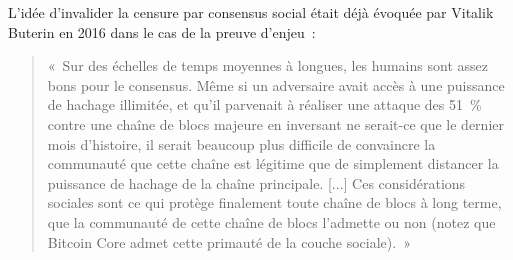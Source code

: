 L'idée d'invalider la censure par consensus social était déjà évoquée par Vitalik Buterin en 2016 dans le cas de la preuve d'enjeu~:

\begin{quote}
«~Sur des échelles de temps moyennes à longues, les humains sont assez bons pour le consensus. Même si un adversaire avait accès à une puissance de hachage illimitée, et qu'il parvenait à réaliser une attaque des 51~\% contre une chaîne de blocs majeure en inversant ne serait-ce que le dernier mois d'histoire, il serait beaucoup plus difficile de convaincre la communauté que cette chaîne est légitime que de simplement distancer la puissance de hachage de la chaîne principale. [...] Ces considérations sociales sont ce qui protège finalement toute chaîne de blocs à long terme, que la communauté de cette chaîne de blocs l'admette ou non (notez que Bitcoin Core admet cette primauté de la couche sociale).~»
\end{quote}

%

